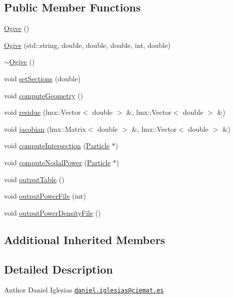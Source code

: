\subsection*{Public Member Functions}
\begin{DoxyCompactItemize}
\item 
\hyperlink{classOgive_af64e93b747bcc7f80d1c64705c335f22}{Ogive} ()
\item 
\hyperlink{classOgive_a4cc1f5beafcd2259677c4053d1ce38d1}{Ogive} (std\-::string, double, double, double, int, double)
\item 
\hyperlink{classOgive_a83d0745d3b4324cb17976fc2dfdd4ac1}{$\sim$\-Ogive} ()
\item 
void \hyperlink{classOgive_a925beac2c2c2ee5f7ad6654a4f1048e5}{set\-Sections} (double)
\item 
void \hyperlink{classOgive_aa8561ca676dbadc7e36a7e9c6b805a72}{compute\-Geometry} ()
\item 
void \hyperlink{classOgive_a849470be3cd2e0db95fd191b0d41f0f5}{residue} (lmx\-::\-Vector$<$ double $>$ \&, lmx\-::\-Vector$<$ double $>$ \&)
\item 
void \hyperlink{classOgive_a3260fd40c32dbb4e1c5f17f7903e7c20}{jacobian} (lmx\-::\-Matrix$<$ double $>$ \&, lmx\-::\-Vector$<$ double $>$ \&)
\item 
void \hyperlink{classOgive_aa2ffe27bec17dcb9b7f99a26d9ec9f6e}{compute\-Intersection} (\hyperlink{classParticle}{Particle} $\ast$)
\item 
void \hyperlink{classOgive_a1f076226bfd547f46542d02c49399693}{compute\-Nodal\-Power} (\hyperlink{classParticle}{Particle} $\ast$)
\item 
void \hyperlink{classOgive_a5febe7a8e9601801d634067213d5c6f9}{output\-Table} ()
\item 
void \hyperlink{classOgive_a260f5f7945194147784025aaf7fe0a72}{output\-Power\-File} (int)
\item 
void \hyperlink{classOgive_a0fc6d6890479d78bbf9eab20969698bc}{output\-Power\-Density\-File} ()
\end{DoxyCompactItemize}
\subsection*{Additional Inherited Members}


\subsection{Detailed Description}
\begin{DoxyAuthor}{Author}
Daniel Iglesias \href{mailto:daniel.iglesias@ciemat.es}{\tt daniel.\-iglesias@ciemat.\-es} 
\end{DoxyAuthor}



